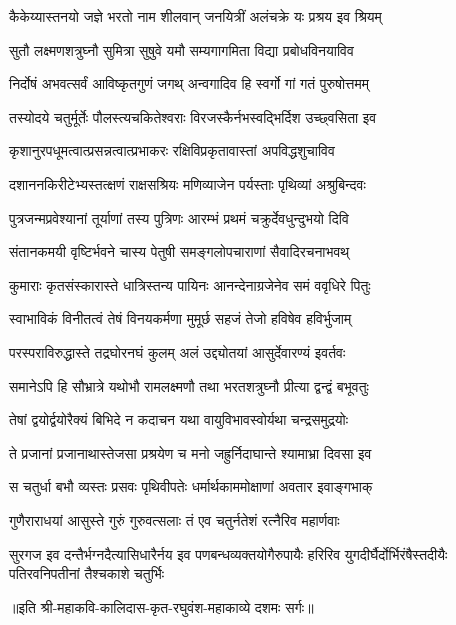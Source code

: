 \twolineshloka
{कैकेय्यास्तनयो जज्ञे भरतो नाम शीलवान्}
{जनयित्रीं अलंचक्रे यः प्रश्रय इव श्रियम्}%

\twolineshloka
{सुतौ लक्ष्मणशत्रुघ्नौ सुमित्रा सुषुवे यमौ}
{सम्यगागमिता विद्या प्रबोधविनयाविव}%

\twolineshloka
{निर्दोषं अभवत्सर्वं आविष्कृतगुणं जगथ्}
{अन्वगादिव हि स्वर्गो गां गतं पुरुषोत्तमम्}%

\twolineshloka
{तस्योदये चतुर्मूर्तेः पौलस्त्यचकितेश्वराः}
{विरजस्कैर्नभस्वद्भिर्दिश उच्छ्वसिता इव}%

\twolineshloka
{कृशानुरपधूमत्वात्प्रसन्नत्वात्प्रभाकरः}
{रक्षिविप्रकृतावास्तां अपविद्धशुचाविव}%

\twolineshloka
{दशाननकिरीटेभ्यस्तत्क्षणं राक्षसश्रियः}
{मणिव्याजेन पर्यस्ताः पृथिव्यां अश्रुबिन्दवः}%

\twolineshloka
{पुत्रजन्मप्रवेश्यानां तूर्याणां तस्य पुत्रिणः}
{आरम्भं प्रथमं चक्रुर्देवधुन्दुभयो दिवि}%

\twolineshloka
{संतानकमयी वृष्टिर्भवने चास्य पेतुषी}
{समङ्गलोपचाराणां सैवादिरचनाभवथ्}%

\twolineshloka
{कुमाराः कृतसंस्कारास्ते धात्रिस्तन्य पायिनः}
{आनन्देनाग्रजेनेव समं ववृधिरे पितुः}%

\twolineshloka
{स्वाभाविकं विनीतत्वं तेषं विनयकर्मणा}
{मुमूर्छ सहजं तेजो हविषेव हविर्भुजाम्}%

\twolineshloka
{परस्पराविरुद्धास्ते तद्रघोरनघं कुलम्}
{अलं उद्द्योतयां आसुर्देवारण्यं इवर्तवः}%

\twolineshloka
{समानेऽपि हि सौभ्रात्रे यथोभौ रामलक्ष्मणौ}
{तथा भरतशत्रुघ्नौ प्रीत्या द्वन्द्वं बभूवतुः}%

\twolineshloka
{तेषां द्वयोर्द्वयोरैक्यं बिभिदे न कदाचन}
{यथा वायुविभावस्वोर्यथा चन्द्रसमुद्रयोः}%

\twolineshloka
{ते प्रजानां प्रजानाथास्तेजसा प्रश्रयेण च}
{मनो जह्रुर्निदाघान्ते श्यामाभ्रा दिवसा इव}%

\twolineshloka
{स चतुर्धा बभौ व्यस्तः प्रसवः पृथिवीपतेः}
{धर्मार्थकाममोक्षाणां अवतार इवाङ्गभाक्}%

\twolineshloka
{गुणैराराधयां आसुस्ते गुरुं गुरुवत्सलाः}
{तं एव चतुर्नतेशं रत्नैरिव महार्णवाः}%

\twolineshloka
{सुरगज इव दन्तैर्भग्नदैत्यासिधारैर्नय इव पणबन्धव्यक्तयोगैरुपायैः}
{हरिरिव युगदीर्घैर्दोर्भिरंषैस्तदीयैः पतिरवनिपतीनां तैश्चकाशे चतुर्भिः}%

॥इति श्री-महाकवि-कालिदास-कृत-रघुवंश-महाकाव्ये दशमः सर्गः॥

